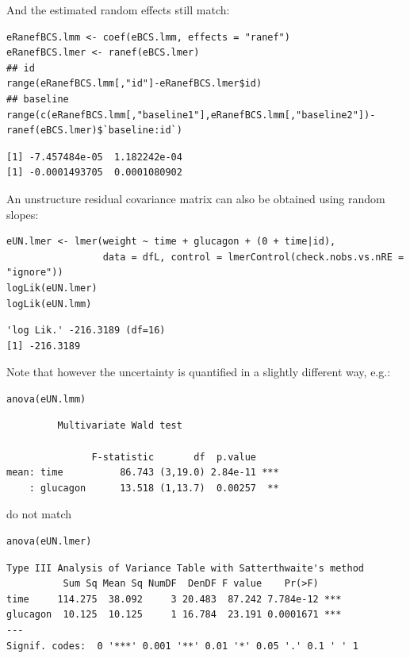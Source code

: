 \documentclass[12pt]{article}
\begin{document}
And the estimated random effects still match:
\lstset{language=r,label= ,caption= ,captionpos=b,numbers=none}
\begin{lstlisting}
eRanefBCS.lmm <- coef(eBCS.lmm, effects = "ranef")
eRanefBCS.lmer <- ranef(eBCS.lmer)
## id
range(eRanefBCS.lmm[,"id"]-eRanefBCS.lmer$id)
## baseline
range(c(eRanefBCS.lmm[,"baseline1"],eRanefBCS.lmm[,"baseline2"])-ranef(eBCS.lmer)$`baseline:id`)
\end{lstlisting}

\begin{verbatim}
[1] -7.457484e-05  1.182242e-04
[1] -0.0001493705  0.0001080902
\end{verbatim}


\clearpage

An unstructure residual covariance matrix can also be obtained using
random slopes:
\lstset{language=r,label= ,caption= ,captionpos=b,numbers=none}
\begin{lstlisting}
eUN.lmer <- lmer(weight ~ time + glucagon + (0 + time|id),
                 data = dfL, control = lmerControl(check.nobs.vs.nRE = "ignore"))
logLik(eUN.lmer)
logLik(eUN.lmm)
\end{lstlisting}

\begin{verbatim}
'log Lik.' -216.3189 (df=16)
[1] -216.3189
\end{verbatim}


Note that however the uncertainty is quantified in a slightly different way, e.g.:
\lstset{language=r,label= ,caption= ,captionpos=b,numbers=none}
\begin{lstlisting}
anova(eUN.lmm)
\end{lstlisting}

\begin{verbatim}
	     Multivariate Wald test 

               F-statistic       df  p.value    
mean: time          86.743 (3,19.0) 2.84e-11 ***
    : glucagon      13.518 (1,13.7)  0.00257  **
\end{verbatim}


do not match
\lstset{language=r,label= ,caption= ,captionpos=b,numbers=none}
\begin{lstlisting}
anova(eUN.lmer)
\end{lstlisting}

\begin{verbatim}
Type III Analysis of Variance Table with Satterthwaite's method
          Sum Sq Mean Sq NumDF  DenDF F value    Pr(>F)    
time     114.275  38.092     3 20.483  87.242 7.784e-12 ***
glucagon  10.125  10.125     1 16.784  23.191 0.0001671 ***
---
Signif. codes:  0 '***' 0.001 '**' 0.01 '*' 0.05 '.' 0.1 ' ' 1
\end{verbatim}
\end{document}
